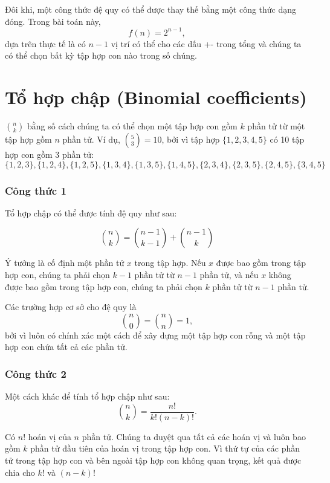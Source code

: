 Đôi khi, một công thức đệ quy có thể được thay thế
bằng một công thức dạng đóng.
Trong bài toán này,
\[
f(n)=2^{n-1},
\]
dựa trên thực tế là có $n-1$
vị trí có thể cho các dấu +- trong tổng
và chúng ta có thể chọn bất kỳ tập hợp con nào trong số chúng.

\section{Tổ hợp chập (Binomial coefficients)}


 ${n \choose k}$
bằng số cách chúng ta có thể chọn một tập hợp con
gồm $k$ phần tử từ một tập hợp gồm $n$ phần tử.
Ví dụ, ${5 \choose 3}=10$,
bởi vì tập hợp $\{1,2,3,4,5\}$
có 10 tập hợp con gồm 3 phần tử:
\[ \{1,2,3\}, \{1,2,4\}, \{1,2,5\}, \{1,3,4\}, \{1,3,5\}, 
\{1,4,5\}, \{2,3,4\}, \{2,3,5\}, \{2,4,5\}, \{3,4,5\} \]

\subsubsection{Công thức 1}

Tổ hợp chập có thể được
tính đệ quy như sau:

\[
{n \choose k}  =  {n-1 \choose k-1} + {n-1 \choose k}
\]

Ý tưởng là cố định một phần tử $x$ trong tập hợp.
Nếu $x$ được bao gồm trong tập hợp con,
chúng ta phải chọn $k-1$
phần tử từ $n-1$ phần tử,
và nếu $x$ không được bao gồm trong tập hợp con,
chúng ta phải chọn $k$ phần tử từ $n-1$ phần tử.

Các trường hợp cơ sở cho đệ quy là
\[
{n \choose 0}  =  {n \choose n} = 1,
\]
bởi vì luôn có chính xác
một cách để xây dựng một tập hợp con rỗng
và một tập hợp con chứa tất cả các phần tử.

\subsubsection{Công thức 2}

Một cách khác để tính tổ hợp chập như sau:
\[
{n \choose k}  =  \frac{n!}{k!(n-k)!}.
\]

Có $n!$ hoán vị của $n$ phần tử.
Chúng ta duyệt qua tất cả các hoán vị và luôn
bao gồm $k$ phần tử đầu tiên của hoán vị
trong tập hợp con.
Vì thứ tự của các phần tử trong tập hợp con
và bên ngoài tập hợp con không quan trọng,
kết quả được chia cho $k!$ và $(n-k)!$

